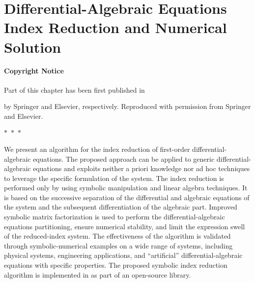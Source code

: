
\chapter[DAEs Index Reduction and Numerical Solution]{Differential-Algebraic Equations Index Reduction and Numerical Solution}
\label{chap6:daes}

\subsubsection{Copyright Notice}
Part of this chapter has been first published in
%
\begin{center}
  \begin{minipage}{0.9\textwidth}
  \end{minipage}
\end{center}
\begin{center}
  \begin{minipage}{0.9\textwidth}
  \end{minipage}
\end{center}
%
by Springer and Elsevier, respectively. Reproduced with permission from Springer and Elsevier.

\begin{center}
  $\ast$~$\ast$~$\ast$
\end{center}

We present an algorithm for the index reduction of first-order differential-algebraic equations. The proposed approach can be applied to generic differential-algebraic equations and exploits neither a priori knowledge nor ad hoc techniques to leverage the specific formulation of the system. The index reduction is performed only by using symbolic manipulation and linear algebra techniques. It is based on the successive separation of the differential and algebraic equations of the system and the subsequent differentiation of the algebraic part. Improved symbolic matrix factorization is used to perform the differential-algebraic equations partitioning, ensure numerical stability, and limit the expression swell of the reduced-index system. The effectiveness of the algorithm is validated through symbolic-numerical examples on a wide range of systems, including physical systems, engineering applications, and ``artificial'' differential-algebraic equations with specific properties. The proposed symbolic index reduction algorithm is implemented in \Maple{} as part of an open-source library.

